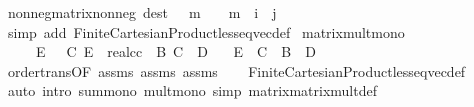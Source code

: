 \begin{isabellebody}
%
\isadelimdocument
%
\endisadelimdocument
{}\isamarkupfalse%
\ nonneg{\isacharunderscore}{\kern0pt}matrix{\isacharunderscore}{\kern0pt}nonneg\ {\isacharbrackleft}{\kern0pt}dest{\isacharbrackright}{\kern0pt}{\isacharcolon}{\kern0pt}\ {\isachardoublequoteopen}{}\ {\isasymle}\ m\ {\isasymLongrightarrow}\ {}\ {\isasymle}\ m\ {\isachardollar}{\kern0pt}\ i\ {\isachardollar}{\kern0pt}\ j{\isachardoublequoteclose}\isanewline
%
\isadelimproof
\ \ %
\endisadelimproof
%
\isatagproof
{}\isamarkupfalse%
\ {\isacharparenleft}{\kern0pt}simp\ add{\isacharcolon}{\kern0pt}\ Finite{\isacharunderscore}{\kern0pt}Cartesian{\isacharunderscore}{\kern0pt}Product{\isachardot}{\kern0pt}less{\isacharunderscore}{\kern0pt}eq{\isacharunderscore}{\kern0pt}vec{\isacharunderscore}{\kern0pt}def{\isacharparenright}{\kern0pt}%
\endisatagproof
{\isafoldproof}%
%
\isadelimproof
\isanewline
%
\endisadelimproof
\isanewline
{}\isamarkupfalse%
\ matrix{\isacharunderscore}{\kern0pt}mult{\isacharunderscore}{\kern0pt}mono{\isacharcolon}{\kern0pt}\ \isanewline
\ \ \ {\isachardoublequoteopen}{}\ {\isasymle}\ E{\isachardoublequoteclose}\ {\isachardoublequoteopen}{}\ {\isasymle}\ C{\isachardoublequoteclose}\ {\isachardoublequoteopen}{\isacharparenleft}{\kern0pt}E\ {\isacharcolon}{\kern0pt}{\isacharcolon}{\kern0pt}\ real{\isacharcircum}{\kern0pt}{\isacharprime}{\kern0pt}c{\isacharcircum}{\kern0pt}{\isacharprime}{\kern0pt}c{\isacharparenright}{\kern0pt}\ {\isasymle}\ B{\isachardoublequoteclose}\ {\isachardoublequoteopen}C\ {\isasymle}\ D{\isachardoublequoteclose}\isanewline
\ \ \ {\isachardoublequoteopen}E\ {\isacharasterisk}{\kern0pt}{\isacharasterisk}{\kern0pt}\ C\ {\isasymle}\ B\ {\isacharasterisk}{\kern0pt}{\isacharasterisk}{\kern0pt}\ D{\isachardoublequoteclose}\isanewline
%
\isadelimproof
\ \ %
\endisadelimproof
%
\isatagproof
{}\isamarkupfalse%
\ order{\isachardot}{\kern0pt}trans{\isacharbrackleft}{\kern0pt}OF\ assms{\isacharparenleft}{\kern0pt}{}{\isacharparenright}{\kern0pt}\ assms{\isacharparenleft}{\kern0pt}{}{\isacharparenright}{\kern0pt}{\isacharbrackright}{\kern0pt}\ assms\isanewline
\ \ \isamarkupfalse%
\ Finite{\isacharunderscore}{\kern0pt}Cartesian{\isacharunderscore}{\kern0pt}Product{\isachardot}{\kern0pt}less{\isacharunderscore}{\kern0pt}eq{\isacharunderscore}{\kern0pt}vec{\isacharunderscore}{\kern0pt}def\isanewline
\ \ \isamarkupfalse%
\ {\isacharparenleft}{\kern0pt}auto\ intro{\isacharbang}{\kern0pt}{\isacharcolon}{\kern0pt}\ sum{\isacharunderscore}{\kern0pt}mono\ mult{\isacharunderscore}{\kern0pt}mono\ simp{\isacharcolon}{\kern0pt}\ matrix{\isacharunderscore}{\kern0pt}matrix{\isacharunderscore}{\kern0pt}mult{\isacharunderscore}{\kern0pt}def{\isacharparenright}{\kern0pt}%

\end{isabellebody}
